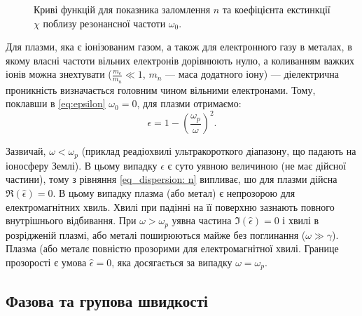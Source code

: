 \begin{figure}[h!]\centering
	
	\caption{Криві функцій для показника заломлення $n$ та коефіцієнта екстинкції $\chi$ поблизу резонансної частоти $\omega_0$.}
	\label{plt:n,a(omega)}
\end{figure}

Для плазми, яка є іонізованим газом, а також для електронного газу в металах, в якому власні частоти вільних електронів дорівнюють нулю, а коливанням важких іонів можна знехтувати ($\frac{m_e}{m_n} \ll 1$, $m_n$ --- маса додатного іону) ---
діелектрична проникність визначається головним чином
вільними електронами. Тому, поклавши в \eqref{eq:epsilon} $\omega_0 = 0$, для плазми отримаємо:
\begin{equation}\label{eq:plasm}
	\epsilon = 1 - \left( \frac{\omega_p}{\omega}\right)^2.
\end{equation}

Зазвичай, $\omega < \omega_p$ (приклад реадіохвилі ультракороткого діапазону, що падають на іоносферу Землі). В цьому випадку $\epsilon$ є суто уявною величиною (не має дійсної частини), тому з рівняння \eqref{eq_dispersion: n} випливає, шо для плазми дійсна $\Re{(\hat{\epsilon})} = 0$. В цьому випадку плазма (або метал) є непрозорою для електромагнітних хвиль. Хвилі при падінні на її поверхню зазнають повного внутрішнього відбивання. При $\omega > \omega_p$ уявна частина $\Im{(\hat{\epsilon})} = 0$ і хвилі в розрідженій плазмі, або металі поширюються майже без поглинання ($\omega \gg \gamma$). Плазма (або металє повністю прозорими для електромагнітної хвилі. Границе прозорості є умова $\hat{\epsilon} = 0$, яка досягається за випадку $\omega = \omega_p$.





\subsection{Фазова та групова швидкості}



